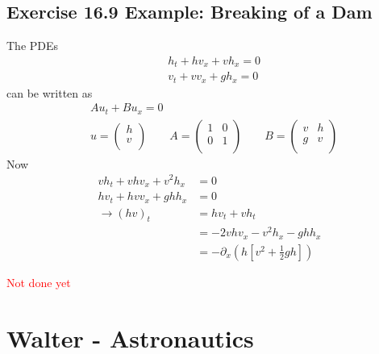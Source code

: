 \documentclass[10pt,a4paper]{book}
\theoremstyle{definition}
\begin{document}
\subsection{Exercise 16.9 Example: Breaking of a Dam}
The PDEs
\begin{align}
    &h_t+hv_x+vh_x=0\\
    &v_t+vv_x+gh_x=0
\end{align}
can be written as
\begin{align}
&Au_t+Bu_x=0\\
&u=\left(
\begin{array}{c}
 h \\
 v \\
\end{array}
\right)\qquad
A=\left(
\begin{array}{cc}
 1 & 0 \\
 0 & 1 \\
\end{array}
\right)
\qquad
B=\left(
\begin{array}{cc}
 v & h  \\
 g & v  \\
\end{array}
\right)
\end{align}
Now
\begin{align}
    vh_t+vhv_x+v^2h_x&=0\\
    hv_t+hvv_x+ghh_x&=0\\
    \rightarrow (hv)_t&=hv_t+vh_t\\
    &=-2vhv_x-v^2h_x-ghh_x\\
    &=-\partial_x\left(h\left[v^2+\frac{1}{2}gh\right]\right)
\end{align}

\textcolor{red}{Not done yet}

\section{{\sc Walter} - Astronautics}
\end{document}
